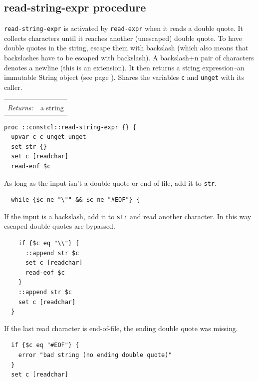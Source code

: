 \documentclass[a5paper,draft]{memoir}
\begin{document}
\subsection{read-string-expr procedure}
\label{readstringexpr-procedure}

\texttt{read-string-expr} is activated by \texttt{read-expr} when it reads a double quote. It collects characters until it reaches another (unescaped) double quote. To have double quotes in the string, escape them with backslash (which also means that backslashes have to be escaped with backslash). A backslash+n pair of characters denotes a newline (this is an extension). It then returns a string expression--an immutable String object (see page \pageref{strings}). Shares the variables \texttt{c} and \texttt{unget} with its caller.

\noindent\begin{tabular}{ |p{1.9cm} p{6.5cm}| }
\hline
\rowcolor[HTML]{CCCCCC} \multicolumn{2}{|l|}{\textbf{read-string-expr (internal)}} \\
\textit{Returns:} & a string \\
\hline
\end{tabular}

\begin{lstlisting}
proc ::constcl::read-string-expr {} {
  upvar c c unget unget
  set str {}
  set c [readchar]
  read-eof $c
\end{lstlisting}

As long as the input isn't a double quote or end-of-file, add it to \texttt{str}.

\begin{lstlisting}
  while {$c ne "\"" && $c ne "#EOF"} {
\end{lstlisting}

If the input is a backslash, add it to \texttt{str} and read another character. In this way escaped double quotes are bypassed.

\begin{lstlisting}
    if {$c eq "\\"} {
      ::append str $c
      set c [readchar]
      read-eof $c
    }
    ::append str $c
    set c [readchar]
  }
\end{lstlisting}

If the last read character is end-of-file, the ending double quote was missing.

\begin{lstlisting}
  if {$c eq "#EOF"} {
    error "bad string (no ending double quote)"
  }
  set c [readchar]
\end{lstlisting}
\end{document}
